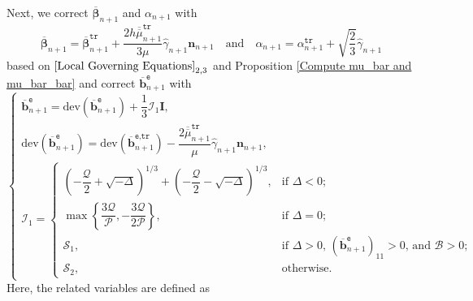 \documentclass[preprint,11pt]{elsarticle}
\theoremstyle{definition}
\begin{document}
Next, we correct $\overline{\boldsymbol{\beta}}_{n+1}$ and $\alpha_{n+1}$ with
\begin{equation} \label{Updated beta and alpha}
    \overline{\boldsymbol{\beta}}_{n+1} = \overline{\boldsymbol{\beta}}_{n+1}^\texttt{tr}
    + \dfrac{2 h \overline{\overline{\mu}}_{n+1}^\texttt{tr}}{3 \mu} \widehat{\gamma}_{n+1} \mathbf{n}_{n+1}
    \quad \text{and} \quad
    \alpha_{n+1} = \alpha_{n+1}^\texttt{tr} + \sqrt{\dfrac{2}{3}} \widehat{\gamma}_{n+1}
\end{equation}
based on $\eqref{Local Governing Equations}_{2,3}$ and Proposition \ref{Compute mu_bar and mu_bar_bar} and correct $\overline{\mathbf{b}}_{n+1}^\texttt{e}$ with
\begin{equation} \label{Updated be_bar}
    \left\{ \begin{array}{l}
        \overline{\mathbf{b}}_{n+1}^\texttt{e}
        = \text{dev} \left( \overline{\mathbf{b}}_{n+1}^\texttt{e} \right) + \dfrac{1}{3} \mathcal{I}_1 \mathbf{I}, \\[12pt]

        \text{dev} \left( \overline{\mathbf{b}}_{n+1}^\texttt{e} \right) = \text{dev} \left( \overline{\mathbf{b}}_{n+1}^\texttt{e,tr} \right) - \dfrac{2 \overline{\overline{\mu}}_{n+1}^\texttt{tr}}{\mu} \widehat{\gamma}_{n+1} \mathbf{n}_{n+1}, \\[12pt]

        \mathcal{I}_1 = \left\{ \begin{array}{ll}
            \left( -\dfrac{\mathcal{Q}}{2} + \sqrt{-\Delta} \right)^{1/3} + \left( -\dfrac{\mathcal{Q}}{2} - \sqrt{-\Delta} \right)^{1/3}, & \text{if $\Delta < 0$;} \\[12pt]
    
            \max \left\{ \dfrac{3 \mathcal{Q}}{\mathcal{P}}, - \dfrac{3 \mathcal{Q}}{2 \mathcal{P}} \right\}, & \text{if $\Delta = 0$;} \\[12pt]  
    
            \mathcal{S}_1, & \text{if $\Delta > 0$, $\left( \overline{\mathbf{b}}_{n+1}^\texttt{e} \right)_{11} > 0$,
            and $\mathcal{B} > 0$}; \\[12pt]
    
            \mathcal{S}_2, & \text{otherwise.}
        \end{array} \right.
    \end{array} \right.
\end{equation}
Here, the related variables are defined as
\end{document}
